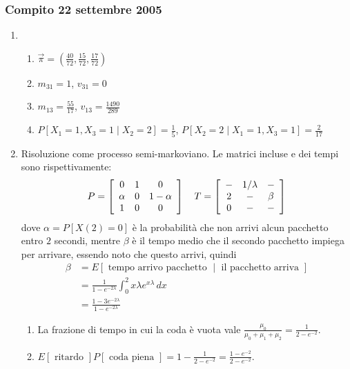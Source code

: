 \documentclass{article}
\begin{document}
\subsubsection{Compito 22 settembre 2005}
\begin{enumerate}
    \item\begin{enumerate}[label=\alph*)]
        \item $\vec{\pi} = (\frac{40}{72},\frac{15}{72},\frac{17}{72})$
        \item $m_{31}=1$, $v_{31}=0$
        \item $m_{13}=\frac{55}{17}$, $v_{13}=\frac{1490}{289}$
        \item $P[X_1 = 1, X_3 = 1\mid X_2 = 2] = \frac{1}{5}$, $P[X_2 = 2\mid X_1 = 1, X_3 = 1] = \frac{2}{17}$
    \end{enumerate}

    \item Risoluzione come processo semi-markoviano. Le matrici incluse e dei tempi sono rispettivamente:
    \begin{align*}
    P=\left[\begin{array}{c c c}
    0 & 1 & 0\\
    \alpha & 0 & 1-\alpha\\
    1 & 0 & 0
    \end{array}\right]
    \quad
    T=\left[\begin{array}{c c c}
    - & 1/\lambda & -\\
    2 &- &\beta\\
    0 & -& -
    \end{array}\right]
    \end{align*}
    dove $\alpha =P[X(2)=0]$ è la probabilità che non arrivi alcun pacchetto entro $2$ secondi, mentre $\beta$ è il tempo medio che il secondo pacchetto impiega per arrivare, essendo noto che questo arrivi, quindi
    \begin{align*}
    \beta &= E[\text{ tempo arrivo pacchetto }\mid\text{ il pacchetto arriva }]\\
    &= \frac{1}{1-e^{-2\lambda}}\int_0^2x\lambda e^{x\lambda}\,dx\\
    &= \frac{1-3e^{-2\lambda}}{1-e^{-2\lambda}}
    \end{align*}
    \begin{enumerate}[label=\alph*)]
        \item La frazione di tempo in cui la coda è vuota vale $\frac{\mu_0}{\mu_0+\mu_1+\mu_2}=\frac{1}{2-e^{-2}}$.
        \item $E[\text{ ritardo }] P[\text{ coda piena }] = 1 - \frac{1}{2-e^{-2}} = \frac{1-e^{-2}}{2-e^{-2}}$.
    \end{enumerate}


\end{enumerate}
\end{document}
